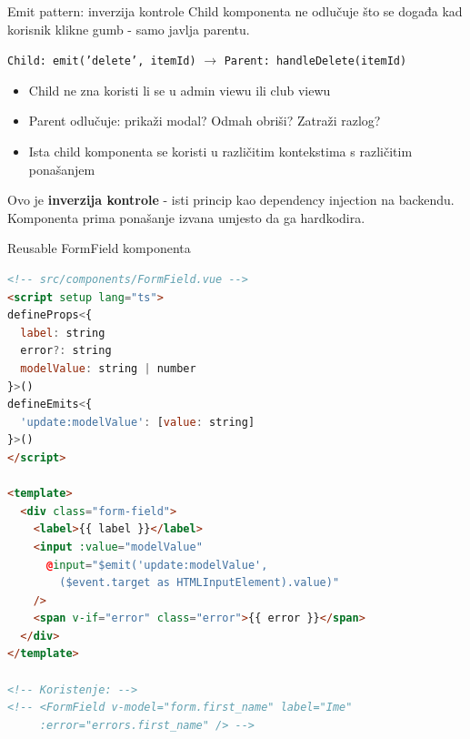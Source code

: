 \begin{frame}{Emit pattern: inverzija kontrole}
Child komponenta ne odlučuje što se događa kad korisnik klikne gumb - samo javlja parentu.

\vspace{0.6em}
\begin{center}
\texttt{Child: emit('delete', itemId)} $\rightarrow$ \texttt{Parent: handleDelete(itemId)}
\end{center}

\vspace{0.6em}
\begin{itemize}
  \item Child ne zna koristi li se u admin viewu ili club viewu
  \item Parent odlučuje: prikaži modal? Odmah obriši? Zatraži razlog?
  \item Ista child komponenta se koristi u različitim kontekstima s različitim ponašanjem
\end{itemize}

\vspace{0.6em}
Ovo je \textbf{inverzija kontrole} - isti princip kao dependency injection na backendu. Komponenta prima ponašanje izvana umjesto da ga hardkodira.
\end{frame}

\begin{frame}[fragile,shrink=5]{Reusable FormField komponenta}
\begin{lstlisting}[language=html]
<!-- src/components/FormField.vue -->
<script setup lang="ts">
defineProps<{
  label: string
  error?: string
  modelValue: string | number
}>()
defineEmits<{
  'update:modelValue': [value: string]
}>()
</script>

<template>
  <div class="form-field">
    <label>{{ label }}</label>
    <input :value="modelValue"
      @input="$emit('update:modelValue',
        ($event.target as HTMLInputElement).value)"
    />
    <span v-if="error" class="error">{{ error }}</span>
  </div>
</template>

<!-- Koristenje: -->
<!-- <FormField v-model="form.first_name" label="Ime"
     :error="errors.first_name" /> -->
\end{lstlisting}
\end{frame}

